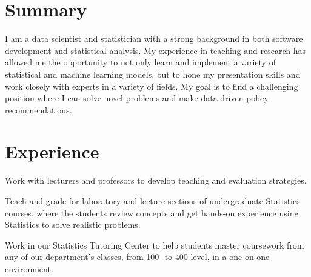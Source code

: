 \documentclass[letterpaper]{deedy-resume} %
\begin{document}
\hfill
%
%
\begin{minipage}[t]{0.63\textwidth} %
\section{Summary}
I am a data scientist and statistician with a strong background in
both software development and statistical analysis.  My experience in
teaching and research has allowed me the opportunity to not only learn
and implement a variety of statistical and machine learning models,
but to hone my presentation skills and work closely with experts in a
variety of fields.  My goal is to find a challenging
position where I can solve novel problems and make data-driven
policy recommendations.


\section{Experience}

\vspace{\topsep} %
\begin{tightitemize}
\item Work with lecturers and professors to develop
  teaching and evaluation strategies.
\item Teach and grade for laboratory and lecture sections of undergraduate Statistics
  courses, where the students review concepts and get hands-on experience
  using Statistics to solve realistic
  problems. 
\item Work in our Statistics Tutoring
  Center to help students master 
  coursework from any of our department's classes, from 100- to
  400-level, in a one-on-one environment.
\end{tightitemize}

\sectionspace %


\end{minipage}
\end{document}
